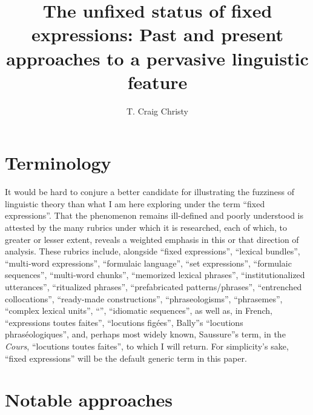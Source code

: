 \documentclass[output=paper]{langsci/langscibook}
\author{T. Craig Christy\affiliation{University of North Alabama}\orcid{}}
\title{The unfixed status of fixed expressions: Past and present approaches to a pervasive linguistic feature}
\begin{document}
\maketitle

\section{Terminology}

It would be hard to conjure a better candidate for illustrating the fuzziness of linguistic theory than what I am here exploring under the term ``fixed expressions''. That the phenomenon remains ill-defined and poorly understood is attested by the many rubrics under which it is researched, each of which, to greater or lesser extent, reveals a weighted emphasis in this or that direction of analysis. These rubrics include, alongside ``fixed expressions'', ``lexical bundles'', ``multi-word expressions'', ``formulaic language'', ``set expressions'', ``formulaic sequences'', ``mul\-ti-word chunks'', ``memorized lexical phrases'', ``institutionalized utterances'', ``ritualized phrases'', ``prefabricated patterns/phrases'', ``entrenched collocations'', ``ready-made constructions'', ``phraseologisms'', ``phrasemes'', ``complex lexical units'', ``'', ``idiomatic sequences'', as well as, in French, ``expressions toutes faites'', ``locutions figées'', Bally''s ``locutions phraséologiques'', and, perhaps most widely known, Saussure''s term, in the \textit{Cours}, ``locutions toutes faites'', to which I will return. For simplicity's sake, ``fixed expressions'' will be the default generic term in this paper. 

\section{Notable approaches}
\end{document}
